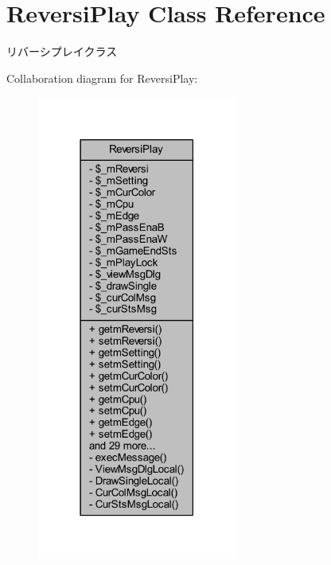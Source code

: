 \hypertarget{class_reversi_play}{}\section{Reversi\+Play Class Reference}
\label{class_reversi_play}


リバーシプレイクラス  




Collaboration diagram for Reversi\+Play\+:
\nopagebreak
\begin{figure}[H]
\begin{center}
\leavevmode
\includegraphics[width=186pt]{class_reversi_play__coll__graph}
\end{center}
\end{figure}
